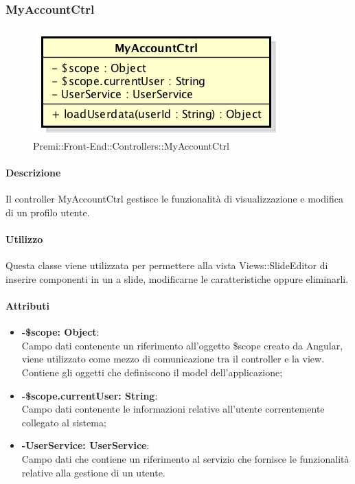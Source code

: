 \newpage	
\subsubsection{MyAccountCtrl}
\begin{figure}[h]
	\centering
	\includegraphics[width=0.4\linewidth]{img/premi_front_end_controllers_myaccountctrl}
	\caption[Premi::Front-End::Controllers::MyAccountCtrl]{Premi::Front-End::Controllers::MyAccountCtrl}
\end{figure}
	\paragraph{Descrizione}
	Il controller MyAccountCtrl gestisce le funzionalità di visualizzazione e modifica di un profilo utente.
	
	\paragraph{Utilizzo}
	Questa classe viene utilizzata per permettere alla vista Views::SlideEditor di inserire componenti in un a slide, modificarne le caratteristiche oppure eliminarli.\\
	\paragraph{Attributi}
	\begin{itemize}
		\item \textbf{-\$scope: Object}:\\
			Campo dati contenente un riferimento all'oggetto \$scope creato da Angular, viene utilizzato come mezzo di comunicazione tra il controller e la view. Contiene gli oggetti che definiscono il model dell'applicazione;	
		\item \textbf{-\$scope.currentUser: String}:\\
			Campo dati contenente le informazioni relative all'utente correntemente collegato al sistema;
		\item \textbf{-UserService: UserService}:\\
			Campo dati che contiene un riferimento al servizio che fornisce le funzionalità relative alla gestione di un utente.
	\end{itemize}
	
